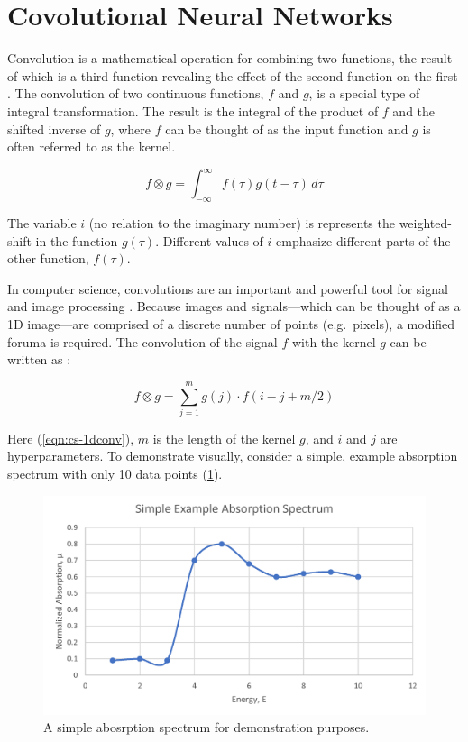 \section{Covolutional Neural Networks}
Convolution is a mathematical operation for combining two functions, the result of which is a third function revealing the effect of the second function on the first \cite{Boas-mathmethods}. The convolution of two continuous functions, $ f $ and $ g $, is a special type of integral transformation. The result is the integral of the product of $ f $ and the shifted inverse of $ g $, where $ f $ can be thought of as the input function and $ g $ is often referred to as the kernel.

\begin{equation}
    f \otimes g = \int_{-\infty}^{\infty} f(\tau)g(t-\tau) \,d\tau 
\end{equation}

\noindent The variable $ i $ (no relation to the imaginary number) is represents the weighted-shift in the function $ g(\tau) $. Different values of $ i $ emphasize different parts of the other function, $ f(\tau) $.  

In computer science, convolutions are an important and powerful tool for signal and image processing \cite{1dconv-NN-survey} \cite{deepCNNforImages}. Because images and signals---which can be thought of as a 1D image---are comprised of a discrete number of points (e.g.~pixels), a modified foruma is required. The convolution of the signal $ f $ with the kernel $ g $ can be written as \cite{cornell-convs}:

\begin{equation}
    \label{eqn:cs-1dconv}
    f \otimes g = \sum_{j=1}^m g(j) \cdot  f(i-j+m/2)
\end{equation}

\noindent Here (\ref{eqn:cs-1dconv}), $ m $ is the length of the kernel $ g $, and $ i $ and $ j $ are hyperparameters. To demonstrate visually, consider a simple, example absorption spectrum with only 10 data points (\ref{fig:conv-ex-spectrum}).

\begin{figure}[h!]
    \centering
    \includegraphics[width=.75\linewidth]{Chapters/Figures/conv-example.png}
    \caption[Toy Absorption Spectrum]{A simple abosrption spectrum for demonstration purposes.}
    \label{fig:conv-ex-spectrum}
\end{figure}
 
